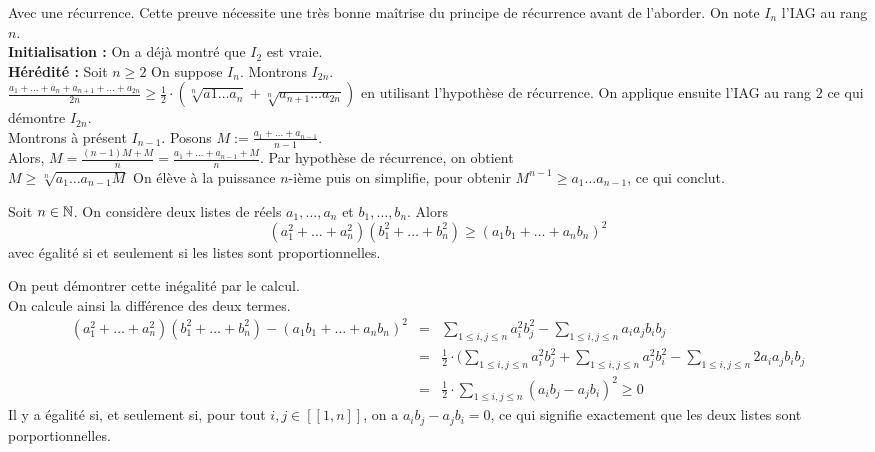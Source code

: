 \begin{preuve}
Avec une récurrence. Cette preuve nécessite une très bonne maîtrise du principe de récurrence avant de l'aborder. On note $I_n$ l'IAG au rang $n$. \\
\textbf{Initialisation :} On a déjà montré que $I_2$ est vraie. \\
\textbf{Hérédité :} Soit $n\ge 2$ On suppose $I_n$. Montrons $I_{2n}$. \\ $\frac{a_1+ \dots + a_n + a_{n+1} + \dots + a_{2n}}{2n} \ge \frac{1}2 \cdot (\sqrt[n]{a1\dots a_n} + \sqrt[n]{a_{n+1}\dots a_{2n}})$ en utilisant l'hypothèse de récurrence.
On applique ensuite l'IAG au rang $2$ ce qui démontre $I_{2n}$. \\ Montrons à présent $I_{n-1}$. Posons $M := \frac{a_1+\dots + a_{n-1}}{n-1}$. \\ Alors, $M = \frac{(n-1)M+M}{n} = \frac{a_1+\dots+a_{n-1} + M}{n}$. Par hypothèse de récurrence, on obtient \\ $M \ge \sqrt[n]{a_1 \dots a_{n-1} M} $ On élève à la puissance $n$-ième puis on simplifie, pour obtenir $M^{n-1} \ge a_1\dots a_{n-1}$, ce qui conclut.
\end{preuve}

\begin{pro}
Soit $n \in \mathbb N$. On considère deux listes de réels $a_1, \dots, a_n$ et $b_1, \dots, b_n$. Alors
$$(a_1^2 + \dots + a_n^2)(b_1^2 + \dots + b_n^2) \ge (a_1b_1 + \dots + a_nb_n)^2$$
avec égalité si et seulement si les listes sont proportionnelles.
\end{pro}

\begin{preuve} On peut démontrer cette inégalité par le calcul. \\
  On calcule ainsi la différence des deux termes.
\begin{eqnarray*}
(a_1^2 +\dots + a_n^2)(b_1^2 + \dots + b_n^2) - (a_1b_1 + \dots + a_nb_n)^2
& = & \sum_{1\le i, j \le n} a_i^2b_j^2 - \sum_{1 \le i, j \le n} a_ia_jb_ib_j \\
& = & \frac 12 \cdot (\sum_{1\le i, j \le n} a_i^2b_j^2 + \sum_{1\le i, j \le n} a_j^2b_i^2 - \sum_{1 \le i, j \le n} 2a_ia_jb_ib_j \\
& = & \frac 12 \cdot \sum_{1\le i, j \le n} (a_ib_j - a_jb_i)^2 \ge 0
\end{eqnarray*}
Il y a égalité si, et seulement si, pour tout $i, j \in [\![1, n]\!]$, on a $a_ib_j - a_jb_i = 0$, ce qui signifie exactement que les deux listes sont porportionnelles.
\end{preuve}

